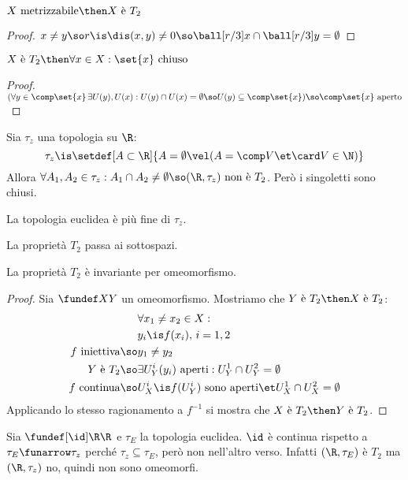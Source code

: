 \begin{prop}
$X\text{ metrizzabile}\then X\text{ è }T_2$
\end{prop}
\begin{proof}
$x\neq y\so r\is\dis(x,y)\neq 0\so\ball[r/3]x\cap\ball[r/3]y=\emptyset$
\end{proof}

\begin{prop}
$X\text{ è }T_2\then\forall x\in X:\set{x}\text{ chiuso}$
\end{prop}
\begin{proof}
$(\forall y\in\comp\set{x}\,\exists U(y),U(x):U(y)\cap U(x)=\emptyset\so U(y)\subseteq\comp\set{x})\so\comp\set{x}\text{ aperto}$
\end{proof}

\begin{es}
Sia $\tau_z$ una topologia su $\R$:
\[\tau_z\is\setdef[A\subset\R]{A=\emptyset\vel(A=\comp V\et\card V\in\N)}\]
Allora $\forall A_1,A_2\in\tau_z:A_1\cap A_2\neq\emptyset\so(\R,\tau_z)\text{ non è }T_2$. Però i singoletti sono chiusi.
\end{es}

\begin{oss}
La topologia euclidea è più fine di $\tau_z$.
\end{oss}

\begin{prop}
La proprietà $T_2$ passa ai sottospazi.
\end{prop}

\begin{prop}
La proprietà $T_2$ è invariante per omeomorfismo.
\end{prop}
\begin{proof}
Sia $\fundef XY$ un omeomorfismo. Mostriamo che $Y\text{ è }T_2\then X\text{ è }T_2$:
\begin{align*}
&\forall x_1\neq x_2\in X:\\
&y_i\is f(x_i),\,i=1,2\\
f\text{ iniettiva}\so&y_1\neq y_2\\
Y\text{ è }T_2\so&\exists U_Y^i(y_i)\text{ aperti}:U_Y^1\cap U_Y^2=\emptyset\\
f\text{ continua}\so&U_X^i\is f(U_Y^i)\text{ sono aperti}\et U_X^1\cap U_X^2=\emptyset
\end{align*}
Applicando lo stesso ragionamento a $f^{-1}$ si mostra che $X\text{ è }T_2\then Y\text{ è }T_2$.
\end{proof}

\begin{es}
Sia $\fundef[\id]\R\R$ e $\tau_E$ la topologia euclidea. $\id$ è continua rispetto a $\tau_E\funarrow\tau_z$ perché $\tau_z\subseteq\tau_E$, però non nell'altro verso. Infatti $(\R,\tau_E)$ è $T_2$ ma $(\R,\tau_z)$ no, quindi non sono omeomorfi.
\end{es}

